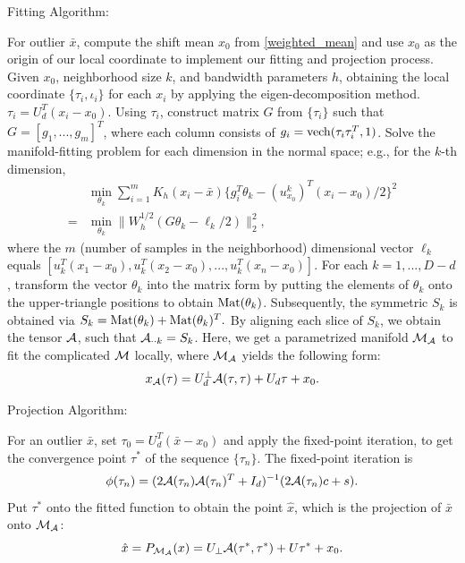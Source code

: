 \documentclass{article}
\theoremstyle{remark}
\begin{document}
\begin{algorithm}[H]
\caption{Fitting Algorithm:}
\label{alg:Fitting}
\begin{algorithmic}
\STATE [1.] For outlier $\bar{x}$, compute the shift mean $x_0$ from \eqref{weighted_mean} and use $x_0$ as the origin of our local coordinate to implement our fitting and projection process.
\STATE [2.] Given $x_0$, neighborhood size $k$, and bandwidth parameters $h$, obtaining the local coordinate $\{\tau_i, \iota_i\}$ for each $x_i$ by applying the eigen-decomposition method.
$
{\tau}_i = U_d^T(x_i-x_0).%
$
Using $\tau_i$, construct matrix $G$ from $\{\tau_i\}$ such that $G = [g_1,...,g_m]^T$, where each column consists of $g_i = {\rm vech}(\tau_i\tau_i^T, 1)$.%
\STATE [3.] Solve the manifold-fitting problem for each dimension in the normal space; e.g., %
for the $k$-th dimension,
\[
\begin{aligned}
  &\min_{\theta_k} \sum_{i=1}^m K_h(x_i-\bar{x})\{ g_i^T \theta_k  -  {(u^k_{x_0})}^T (x_i -x_0)/2\}^2\\
= &\min_{\theta_k}\|W_h^{1/2}(G \theta_k-\ell_k/2) \|_2^2,
\end{aligned}
\]
where the $m$ (number of samples in the neighborhood) dimensional vector $\ell_k$ equals $[u_k^T(x_1-x_0), u_k^T(x_2-x_0),...,u_k^T(x_n-x_0)]$.
\STATE [4.] For each $k=1,...,D-d$, transform the vector $\theta_k$ into the matrix form by putting the elements of $\theta_k$ onto the upper-triangle positions to obtain ${\rm Mat}(\theta_k)$.  Subsequently, the symmetric $S_k$ is obtained via %
$
S_k = {\rm Mat}(\theta_k) + {\rm Mat}(\theta_k) ^T.
$
By aligning each slice of $S_k$, we obtain the tensor $\cal A$, such that ${\cal A}_{\cdot \cdot k}=S_k$.
Here, we get a parametrized manifold ${\cal M_A}$ to fit the complicated $\cal M$ locally, where ${\cal M_A}$ yields the following form:
\[
x_{\cal A}(\tau) = U_{d}^{\perp} {\cal A} (\tau, \tau) + U_d \tau +x_0.
\]
\end{algorithmic}
\end{algorithm}
\begin{algorithm}[H]
\caption{Projection Algorithm:}
\label{alg:projection}
\begin{algorithmic}
\STATE [1.] For an outlier $\bar{x}$, set $\tau_0 = U_d^T(\bar{x}-x_0)$ and apply the fixed-point iteration, to get the convergence point $\tau^*$ of the sequence $\{\tau_n\}$. The fixed-point iteration is
\[
 \phi(\tau_{n})=( 2{\cal A}(\tau_{n}){\cal A}(\tau_{n})^T+ I_d)^{-1} (2{\cal A}(\tau_{n})c+ s).
\]
\STATE [2.] Put $\tau^*$ onto the fitted function  to obtain the point $\hat{x}$, which is the projection of $\bar{x}$ onto ${\cal M}_{\cal A}$:
\[
\hat{x} = P_{\cal M_A} (x) =  U_{\perp} {\cal A} (\tau^*,\tau^*) + U \tau^* +x_0.
\]
\end{algorithmic}
\end{algorithm}
\end{document}
